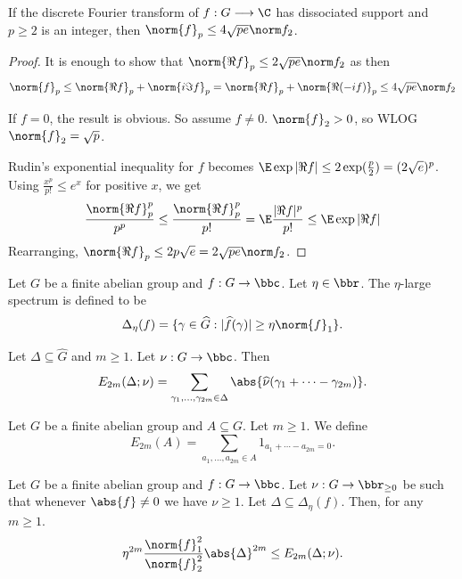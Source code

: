 \begin{lemma}
\label{rudin}
\leanok
If the discrete Fourier transform of $f : G \longrightarrow \C$ has dissociated support and $p \ge 2$ is an integer, then $\norm{f}_p \le 4\sqrt{pe} \norm f_2$.
\end{lemma}
\begin{proof}
\leanok
It is enough to show that $\norm{\Re f}_p \le 2\sqrt{pe} \norm f_2$ as then
$$\norm{f}_p \le \norm{\Re f}_p + \norm{i \Im f}_p = \norm{\Re f}_p + \norm{\Re (-if)}_p \le 4\sqrt{pe} \norm f_2$$

If $f = 0$, the result is obvious. So assume $f \ne 0$. $\norm{f}_2 > 0$, so WLOG $\norm{f}_2 = \sqrt p$.

Rudin's exponential inequality for $f$ becomes $\E \exp|\Re f| \le 2\exp(\frac p 2) = (2\sqrt e)^p$. Using $\frac{x^p}{p!} \le e^x$ for positive $x$, we get
$$\frac{\norm{\Re f}_p^p}{p^p} \le \frac{\norm{\Re f}_p^p}{p!} = \E \frac{|\Re f|^p}{p!} \le \E \exp|\Re f|$$
Rearranging, $\norm{\Re f}_p \le 2 p\sqrt{e} = 2 \sqrt{pe} \norm f_2$.
\end{proof}


\begin{definition}
  \label{large_spec}
  \leanok

  Let $G$ be a finite abelian group and $f:G\to\bbc$. Let $\eta\in \bbr$. The $\eta$-large spectrum is defined to be
  \[\Delta_\eta(f) = \{ \gamma\in\widehat{G} : \lvert \widehat{f}(\gamma)\rvert \geq \eta\norm{f}_1\}.\]
\end{definition}


\begin{definition}
\label{weight_energy}
\leanok
Let $\Delta\subseteq \widehat{G}$ and $m\geq 1$. Let $\nu:G\to \bbc$. Then
\[E_{2m}(\Delta;\nu)=\sum_{\gamma_1,\ldots,\gamma_{2m}\in \Delta}\abs{\widehat{\nu}(\gamma_1+\cdots-\gamma_{2m})}.\]
\end{definition}


\begin{definition}[Energy]
\label{energy}
\leanok
Let $G$ be a finite abelian group and $A\subseteq G$. Let $m\geq 1$. We define
\[E_{2m}(A)=\sum_{a_1,\ldots,a_{2m}\in A}1_{a_1+\cdots-a_{2m}=0}.\]
\end{definition}


\begin{lemma}
\label{general_hoelder}
\leanok
Let $G$ be a finite abelian group and $f:G\to\bbc$. Let $\nu:G\to \bbr_{\geq 0}$ be such that whenever $\abs{f}\neq 0$ we have $\nu \geq 1$. Let $\Delta\subseteq \Delta_\eta(f)$. Then, for any $m\geq 1$.
\[\eta^{2m}\frac{\norm{f}_1^2}{\norm{f}_2^2}\abs{\Delta}^{2m}\le E_{2m}(\Delta;\nu).\]
\end{lemma}

